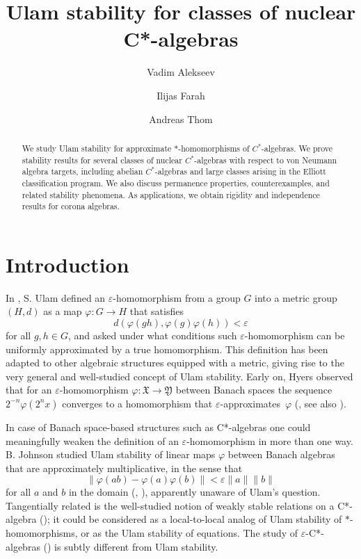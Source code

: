 \documentclass[11pt]{amsproc}
\author{Vadim Alekseev}
\author{Ilijas Farah}
\author{Andreas Thom}
\newcommand{\cstar}{C*}
\newcommand{\frX}{\mathfrak X}
\newcommand{\frY}{\mathfrak Y}
\theoremstyle{definition}
\theoremstyle{plain}
\theoremstyle{remark}
\begin{document}
\title{Ulam stability for classes of nuclear \cstar-algebras}

\begin{abstract}
We study Ulam stability for approximate \(*\)-homomorphisms of
\(C^*\)-algebras. We prove stability results for several classes of nuclear
\(C^*\)-algebras with respect to von Neumann algebra targets, including
abelian \(C^*\)-algebras and large classes arising in the Elliott
classification program. We also discuss permanence properties, counterexamples,
and related stability phenomena. As applications, we obtain rigidity and
independence results for corona algebras.
\end{abstract}

\maketitle

\tableofcontents


 \section{Introduction}

In \cite{Ul:Problems}, S. Ulam defined an $\varepsilon$-homomorphism from a group $G$ into a metric group $(H,d)$ as a map $\varphi\colon G\to H$ that satisfies 
\[
d(\varphi(gh),\varphi(g)\varphi(h))<\varepsilon
\] 
for all $g,h \in G$, and asked under what conditions such $\varepsilon$-homomorphism can be uniformly approximated by a true homomorphism. 
This definition has been adapted to other algebraic structures equipped with a metric, giving rise to the very general and well-studied 
concept of Ulam stability. Early on, Hyers observed  that for an  $\varepsilon$-homomorphism $\varphi\colon \frX\to\frY$ between Banach spaces the sequence $2^{-n}\varphi(2^{n} x)$ converges to a  homomorphism that  $\varepsilon$-approximates~$\varphi$ (\cite{hyers1941on}, see also \cite{hyers1992approximate}). 

In case of Banach space-based structures such as \cstar-algebras one could meaningfully weaken the definition of an $\varepsilon$-homomorphism in more than one way. B. Johnson studied Ulam stability of linear maps  $\varphi$ between Banach algebras that 
are approximately multiplicative,  in the sense that 
\[
\|\varphi(ab)-\varphi(a)\varphi(b)\|<\varepsilon \|a\|\|b\|
\]
for all $a$ and $b$ in the domain 
 (\cite{johnson1988approximately}, \cite{johnson1982counterexample}), apparently unaware of Ulam's question. 
Tangentially related is the well-studied notion of weakly stable relations on a \cstar-algebra (\cite{Lo:Lifting}); it could be considered as a local-to-local analog of Ulam stability of $*$-homomorphisms, or as the  Ulam stability of equations.  The study of $\varepsilon$-\cstar-algebras (\cite{kitaev2024almost}) is subtly different from Ulam stability.  
\end{document}
